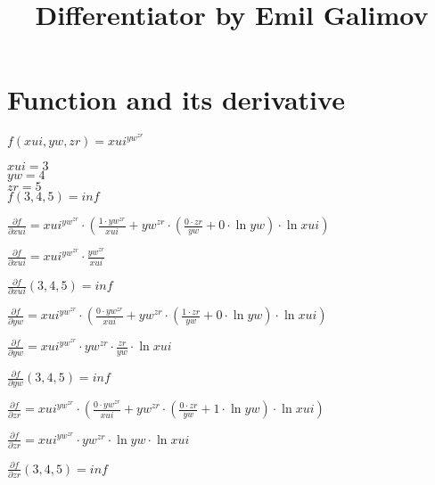 \documentclass{article}
\title{Differentiator by Emil Galimov}
\begin{document}
\maketitle
\section{Function and its derivative}
\begin{center}
$f( xui, yw, zr) = xui^{yw^{zr}}$\\
\end{center}
\begin{center}
$xui = 3$\\ 
$yw = 4$\\ 
$zr = 5$\\ 
$f( 3, 4, 5) = inf$
\end{center}
\begin{center}
$\frac{\partial f}{\partial xui} = xui^{yw^{zr}} \cdot (\frac{1 \cdot yw^{zr}}{xui}+yw^{zr} \cdot (\frac{0 \cdot zr}{yw}+0 \cdot  \ln{yw}) \cdot  \ln{xui})$\\
\end{center}
\begin{center}
$\frac{\partial f}{\partial xui} = xui^{yw^{zr}} \cdot \frac{yw^{zr}}{xui}$\\
\end{center}
\begin{center}
$\frac{\partial f}{\partial xui}(3, 4, 5) = inf$\\
\end{center}
\begin{center}
$\frac{\partial f}{\partial yw} = xui^{yw^{zr}} \cdot (\frac{0 \cdot yw^{zr}}{xui}+yw^{zr} \cdot (\frac{1 \cdot zr}{yw}+0 \cdot  \ln{yw}) \cdot  \ln{xui})$\\
\end{center}
\begin{center}
$\frac{\partial f}{\partial yw} = xui^{yw^{zr}} \cdot yw^{zr} \cdot \frac{zr}{yw} \cdot  \ln{xui}$\\
\end{center}
\begin{center}
$\frac{\partial f}{\partial yw}(3, 4, 5) = inf$\\
\end{center}
\begin{center}
$\frac{\partial f}{\partial zr} = xui^{yw^{zr}} \cdot (\frac{0 \cdot yw^{zr}}{xui}+yw^{zr} \cdot (\frac{0 \cdot zr}{yw}+1 \cdot  \ln{yw}) \cdot  \ln{xui})$\\
\end{center}
\begin{center}
$\frac{\partial f}{\partial zr} = xui^{yw^{zr}} \cdot yw^{zr} \cdot  \ln{yw} \cdot  \ln{xui}$\\
\end{center}
\begin{center}
$\frac{\partial f}{\partial zr}(3, 4, 5) = inf$\\
\end{center}
\end{document}
